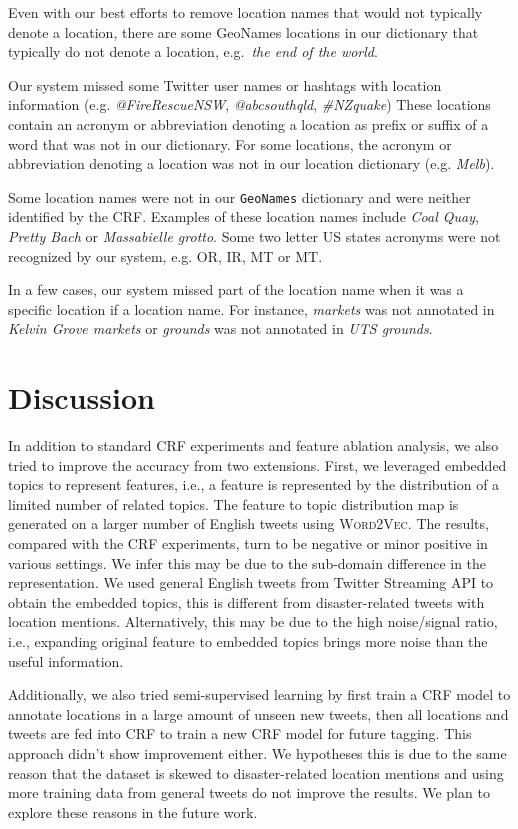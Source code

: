 \documentclass[11pt]{article}
\newcommand{\ie}{i.e.,\xspace}
\newcommand{\geoname}{\texttt{GeoNames}\xspace}
\newcommand{\myex}[1]{\textit{#1}}
\newcommand{\wordvec}{\textsc{Word2Vec}\xspace}
\begin{document}
Even with our best efforts to remove location names that would not typically denote a location, there are some GeoNames locations in our dictionary that typically do not denote a location, e.g.~\myex{the end of the world}.

Our system missed some Twitter user names or hashtags with location information (e.g. \myex{@FireRescueNSW}, \myex{@abcsouthqld}, \myex{\#NZquake})
These locations contain an acronym or abbreviation denoting a location as prefix or suffix of a word that was not in our dictionary.
For some locations, the acronym or abbreviation denoting a location was not in our location dictionary (e.g. \myex{Melb}).

Some location names were not in our \geoname dictionary and were neither identified by the CRF.
Examples of these location names include \myex{Coal Quay}, \myex{Pretty Bach} or \myex{Massabielle grotto}.
Some two letter US states acronyms were not recognized by our system, e.g. OR, IR, MT or MT.

In a few cases, our system missed part of the location name when it was a specific location if a location name.
For instance, \myex{markets} was not annotated in \myex{Kelvin Grove markets} or \myex{grounds} was not annotated in \myex{UTS grounds}.

\section{Discussion}
\label{sec:discussion}

In addition to standard CRF experiments and feature ablation analysis, we also tried to improve the accuracy from two extensions.
First, we leveraged embedded topics to represent features, \ie a feature is represented by the distribution of a limited number of related topics.
The feature to topic distribution map is generated on a larger number of English tweets using \wordvec.
The results, compared with the CRF experiments, turn to be negative or minor positive in various settings.
We infer this may be due to the sub-domain difference in the representation.
We used general English tweets from Twitter Streaming API to obtain the embedded topics, this is different from disaster-related tweets with location mentions.
Alternatively, this may be due to the high noise/signal ratio, \ie expanding original feature to embedded topics brings more noise than the useful information.

Additionally, we also tried semi-supervised learning by first train a CRF model to annotate locations in a large amount of unseen new tweets, then all locations and tweets are fed into CRF to train a new CRF model for future tagging.
This approach didn't show improvement either.
We hypotheses this is due to the same reason that the dataset is skewed to disaster-related location mentions and using more training data from general tweets do not improve the results.
We plan to explore these reasons in the future work.
\end{document}
